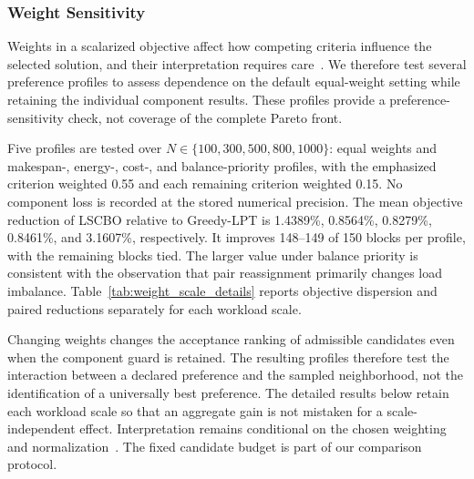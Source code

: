 \documentclass[pdflatex,onecolumn,sn-mathphys-num]{sn-jnl}
\begin{document}
\FloatBarrier
\subsubsection{Weight Sensitivity}\label{sec:weight_sensitivity}
Weights in a scalarized objective affect how competing criteria influence the selected solution, and their interpretation requires care~\cite{MarlerArora2010}. We therefore test several preference profiles to assess dependence on the default equal-weight setting while retaining the individual component results. These profiles provide a preference-sensitivity check, not coverage of the complete Pareto front.

Five profiles are tested over $N\in\{100,300,500,800,1000\}$: equal weights and makespan-, energy-, cost-, and balance-priority profiles, with the emphasized criterion weighted 0.55 and each remaining criterion weighted 0.15. No component loss is recorded at the stored numerical precision. The mean objective reduction of LSCBO relative to Greedy-LPT is 1.4389\%, 0.8564\%, 0.8279\%, 0.8461\%, and 3.1607\%, respectively. It improves 148--149 of 150 blocks per profile, with the remaining blocks tied. The larger value under balance priority is consistent with the observation that pair reassignment primarily changes load imbalance. Table~\ref{tab:weight_scale_details} reports objective dispersion and paired reductions separately for each workload scale.

Changing weights changes the acceptance ranking of admissible candidates even when the component guard is retained. The resulting profiles therefore test the interaction between a declared preference and the sampled neighborhood, not the identification of a universally best preference. The detailed results below retain each workload scale so that an aggregate gain is not mistaken for a scale-independent effect. Interpretation remains conditional on the chosen weighting and normalization~\cite{MarlerArora2010}. The fixed candidate budget is part of our comparison protocol.
\end{document}
